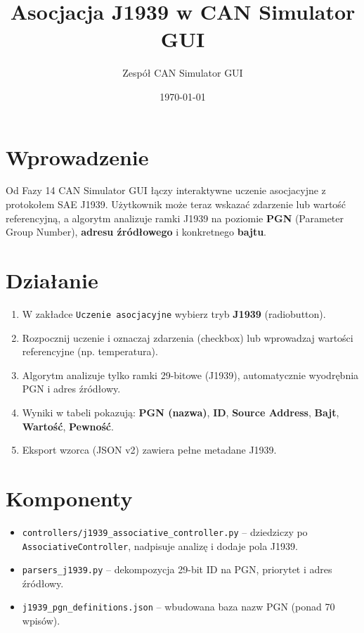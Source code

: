 \documentclass[a4paper,12pt]{article}
\title{Asocjacja J1939 w CAN Simulator GUI}
\author{Zespół CAN Simulator GUI}
\date{\today}
\begin{document}
\maketitle

\section{Wprowadzenie}
Od Fazy 14 CAN Simulator GUI łączy interaktywne uczenie asocjacyjne z protokołem SAE J1939. Użytkownik może teraz wskazać zdarzenie lub wartość referencyjną, a algorytm analizuje ramki J1939 na poziomie \textbf{PGN} (Parameter Group Number), \textbf{adresu źródłowego} i konkretnego \textbf{bajtu}.

\section{Działanie}
\begin{enumerate}[noitemsep]
    \item W zakładce \texttt{Uczenie asocjacyjne} wybierz tryb \textbf{J1939} (radiobutton).
    \item Rozpocznij uczenie i oznaczaj zdarzenia (checkbox) lub wprowadzaj wartości referencyjne (np. temperatura).
    \item Algorytm analizuje tylko ramki 29-bitowe (J1939), automatycznie wyodrębnia PGN i adres źródłowy.
    \item Wyniki w tabeli pokazują: \textbf{PGN (nazwa)}, \textbf{ID}, \textbf{Source Address}, \textbf{Bajt}, \textbf{Wartość}, \textbf{Pewność}.
    \item Eksport wzorca (JSON v2) zawiera pełne metadane J1939.
\end{enumerate}

\section{Komponenty}
\begin{itemize}[noitemsep]
    \item \texttt{controllers/j1939\_associative\_controller.py} – dziedziczy po \texttt{AssociativeController}, nadpisuje analizę i dodaje pola J1939.
    \item \texttt{parsers\_j1939.py} – dekompozycja 29-bit ID na PGN, priorytet i adres źródłowy.
    \item \texttt{j1939\_pgn\_definitions.json} – wbudowana baza nazw PGN (ponad 70 wpisów).
\end{itemize}
\end{document}
